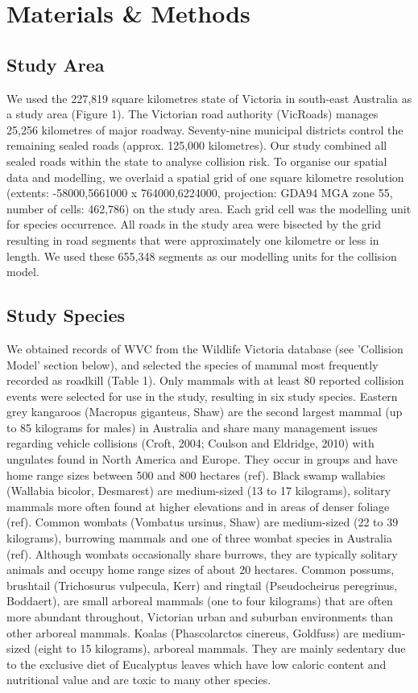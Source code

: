 \section{Materials \& Methods}

\subsection{Study Area}

We used the 227,819 square kilometres state of Victoria in south-east Australia as a study area (Figure 1). The Victorian road authority (VicRoads) manages 25,256 kilometres of major roadway. Seventy-nine municipal districts control the remaining sealed roads (approx. 125,000 kilometres). Our study combined all sealed roads within the state to analyse collision risk. To organise our spatial data and modelling, we overlaid a spatial grid of one square kilometre resolution (extents: -58000,5661000 x 764000,6224000, projection: GDA94 MGA zone 55, number of cells: 462,786) on the study area. Each grid cell was the modelling unit for species occurrence. All roads in the study area were bisected by the grid resulting in road segments that were approximately one kilometre or less in length. We used these 655,348 segments as our modelling units for the collision model.

\subsection{Study Species}

We obtained records of WVC from the Wildlife Victoria database (see 'Collision Model' section below), and selected the species of mammal most frequently recorded as roadkill (Table 1). Only mammals with at least 80 reported collision events were selected for use in the study, resulting in six study species.  Eastern grey kangaroos (Macropus giganteus, Shaw) are the second largest mammal (up to 85 kilograms for males) in Australia and share many management issues regarding vehicle collisions (Croft, 2004; Coulson and Eldridge, 2010) with ungulates found in North America and Europe. They occur in groups and have home range sizes between 500 and 800 hectares (ref).  Black swamp wallabies (Wallabia bicolor, Desmarest) are medium-sized (13 to 17 kilograms), solitary mammals more often found at higher elevations and in areas of denser foliage (ref). Common wombats (Vombatus ursinus, Shaw) are medium-sized (22 to 39 kilograms), burrowing mammals and one of three wombat species in Australia (ref). Although wombats occasionally share burrows, they are typically solitary animals and occupy home range sizes of about 20 hectares. Common possums, brushtail (Trichosurus vulpecula, Kerr) and ringtail (Pseudocheirus peregrinus, Boddaert), are small arboreal mammals (one to four kilograms) that are often more abundant throughout, Victorian urban and suburban environments than other arboreal mammals.  Koalas (Phascolarctos cinereus, Goldfuss) are medium-sized (eight to 15 kilograms), arboreal mammals.  They are mainly sedentary due to the exclusive diet of Eucalyptus leaves which have low caloric content and nutritional value and are toxic to many other species.

